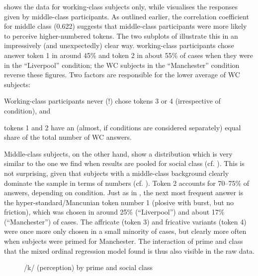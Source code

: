  shows the data for working-class subjects only, while  visualises the responses given by middle-class participants.
As outlined earlier, the correlation coefficient 
for middle class (0.622) suggests that middle-class participants were more likely to perceive higher-numbered tokens.
The two subplots of  illustrate this in an impressively (and unexpectedly) clear way.
working-class participants chose answer token 1 in around 45\% and token 2 in about 55\% of cases when they were in the ``Liverpool'' condition; the WC subjects in the ``Manchester'' condition reverse these figures.
Two factors are responsible for the lower average of WC subjects:
\begin{inparaenum}[(a)]
	\item Working-class participants never (!) chose tokens 3 or 4 (irrespective of  condition), and
	\item tokens 1 and 2 have an (almost, if conditions are considered separately) equal share of the total number of WC answers.
\end{inparaenum} 

Middle-class subjects, on the other hand, show a distribution which is very similar to the one we find when results are pooled for social class (cf. ).
This is not surprising, given that subjects with a middle-class background clearly dominate the sample in terms of numbers (cf. ).
Token 2 accounts for 70--75\% of answers, depending on  condition.
Just as in , the next most frequent answer is the hyper-standard/Mancunian token number 1 (plosive with burst, but no friction), which was chosen in around 25\% (``Liverpool'') and about 17\% (``Manchester'') of cases.
The affricate (token 3) and fricative variants (token 4) were once more only chosen in a small minority of cases, but clearly more often when subjects were primed for Manchester.
The interaction of prime and class that the mixed ordinal regression model found is thus also visible in the raw data.

\begin{figure}
	
		\resizebox{.49\linewidth}{!}{} 
	\caption{/k/ (perception) by prime and social class}
	\label{fig.scatter.k.ext.classprime}
\end{figure}

